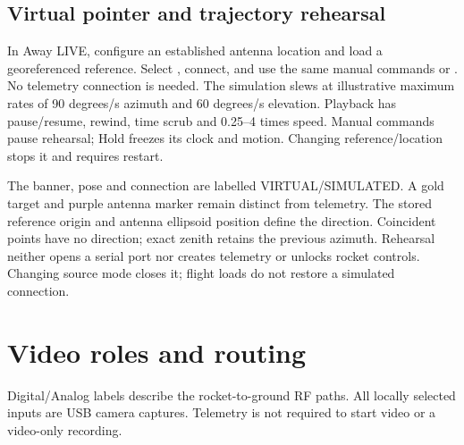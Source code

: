 
\subsection{Virtual pointer and trajectory rehearsal}
In Away LIVE, configure an established antenna location and load a georeferenced
reference. Select , connect, and use the same
manual commands or . No telemetry connection is needed.
The simulation slews at illustrative maximum rates of 90 degrees/s azimuth
and 60 degrees/s elevation. Playback has pause/resume, rewind, time scrub and
0.25--4 times speed. Manual commands pause rehearsal; Hold freezes its clock
and motion. Changing reference/location stops it and requires restart.

The banner, pose and connection are labelled VIRTUAL/SIMULATED. A gold target
and purple antenna marker remain distinct from telemetry. The stored reference
origin and antenna ellipsoid position define the direction. Coincident points
have no direction; exact zenith retains the previous azimuth. Rehearsal neither
opens a serial port nor creates telemetry or unlocks rocket controls. Changing
source mode closes it; flight loads do not restore a simulated connection.


\section{Video roles and routing}\label{sec:video}
Digital/Analog labels describe the rocket-to-ground RF paths. All locally
selected inputs are USB camera captures. Telemetry is not required to start
video or a video-only recording.

